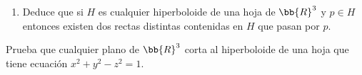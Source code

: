 \begin{ejercicio}
\begin{enumerate}
        \item Deduce que si $H$ es cualquier hiperboloide de una hoja de $\bb{R}^3$ y $p \in H$ entonces existen dos rectas distintas contenidas en $H$ que pasan por $p$.
        
    \end{enumerate}
\end{ejercicio}


\begin{ejercicio}
    Prueba que cualquier plano de $\bb{R}^3$ corta al hiperboloide de una hoja que tiene ecuación $x^2+y^2-z^2 = 1$.

    
\end{ejercicio}



